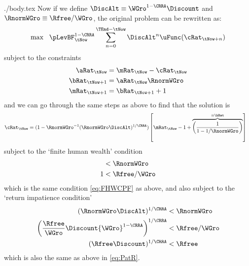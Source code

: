 \documentclass{handout}
\begin{document}
\begin{verbatimwrite}{./body.tex}
Now if we define $\DiscAlt \equiv {\WGro}^{1-\CRRA}\Discount$ and $\RnormWGro \equiv \Rfree/{\WGro}$,
the original problem can be rewritten as:
\begin{equation}
\max~~\pLevBF_{\tNow}^{1-\CRRA}\sum_{n=0}^{\TEnd-\tNow} \DiscAlt^{n} \uFunc(\cRat_{\tNow+n})             \label{eq:scaledmaxprob}
\end{equation}
subject to the constraints
\begin{equation}\begin{gathered}\begin{aligned}
   \aRat_{\tNow}   & =  \mRat_{\tNow}-\cRat_{\tNow}
\\ \bRat_{\tNow+1} & =  \aRat_{\tNow}\RnormWGro
\\ \mRat_{\tNow+1} & =  \bRat_{\tNow+1}+1
\end{aligned}\end{gathered}\end{equation}
and we can go through the same steps as above to find that the solution
is
\begin{equation}\begin{gathered}\begin{aligned}
        \cRat_{\tNow} & =  (1-\RnormWGro^{-1}(\RnormWGro\DiscAlt)^{1/\CRRA})\left[\mRat_{\tNow}-1+\overbrace{\left(\frac{1}{1-{1}/\RnormWGro}\right)}^{\equiv\hRat}\right] \label{eq:normC}
\end{aligned}\end{gathered}\end{equation}
subject to the `finite human wealth' condition
\begin{equation}\begin{gathered}\begin{aligned}
        {1} & <  \RnormWGro
\\  1 & <  \Rfree/\WGro
\end{aligned}\end{gathered}\end{equation}
which is the same condition \eqref{eq:FHWCPF} as above, and also subject to the `return impatience condition'
\begin{equation}\begin{gathered}\begin{aligned}
                (\RnormWGro\DiscAlt)^{1/\CRRA} & <  \RnormWGro  
\\              \left(\frac{\Rfree}{{\WGro}}\Discount {\WGro}^{1-\CRRA}\right)^{1/\CRRA} & <  \Rfree/{\WGro}  
\\              (\Rfree\Discount)^{1/\CRRA} & <  \Rfree  
\end{aligned}\end{gathered}\end{equation}  
which is also the same as above in \eqref{eq:PatR}.


\end{verbatimwrite}
\end{document}
